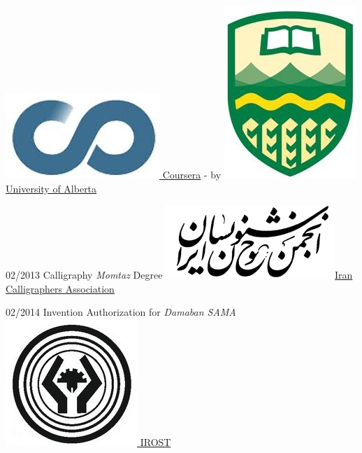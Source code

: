\documentclass[a4paper]{./classes/friggeri-cv}
\begin{document}
\begin{entrylist}
        {\href{http://coursera.org/}{\includegraphics[scale=0.08]{../assets/images/logos/Coursera_logo.jpg} Coursera} - by \href{https://www.ualberta.ca/}{\includegraphics[scale=0.05]{../assets/images/logos/UAlberta_logo.jpg} University of Alberta}}
        {}

        \entry
        {02/2013}
        {Calligraphy \emph{Momtaz} Degree}
        {\href{http://calligraphers.ir/}{\includegraphics[scale=0.15]{../assets/images/logos/Khoshnevisan_logo.png}Iran Calligraphers Association}}
        {}

        \entry
        {02/2014}
        {Invention Authorization for \emph{Damaban SAMA}}
        {\href{http://www.irost.org/}{\includegraphics[scale=0.09]{../assets/images/logos/IROST_logo.jpg} IROST}}
        {}

    \end{entrylist}

\end{document}
